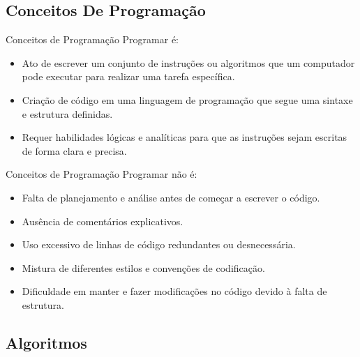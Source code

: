 \documentclass{beamer}
\begin{document}
\subsection{Conceitos De Programação}

\begin{frame}{Conceitos de Programação}
	\label{o_que_e_programar}
	Programar é:
	
	\begin{itemize}
		\item Ato de escrever um conjunto de instruções ou algoritmos que um computador pode executar para realizar uma tarefa específica.
		\item Criação de código em uma linguagem de programação que segue uma sintaxe e estrutura definidas.
		\item Requer habilidades lógicas e analíticas para que as instruções sejam escritas de forma clara e precisa.
	\end{itemize}

\end{frame}

\begin{frame}{Conceitos de Programação}
	\label{o_que_nao_e_programar}
	Programar não é:
	
	\begin{itemize}
		\item Falta de planejamento e análise antes de começar a escrever o código.
		\item Ausência de comentários explicativos.
		\item Uso excessivo de linhas de código redundantes ou desnecessária.
		\item Mistura de diferentes estilos e convenções de codificação.
		\item Dificuldade em manter e fazer modificações no código devido à falta de estrutura.
	\end{itemize}
	
\end{frame}

\subsection{Algoritmos}
\end{document}
